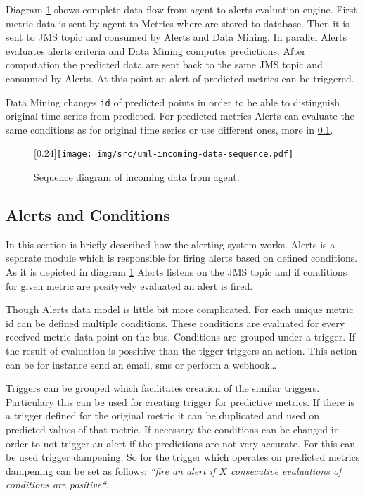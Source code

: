     Diagram \ref{img:sequence-incoming-data} shows complete data flow from agent to alerts evaluation engine.
    First metric data is sent by agent to Metrics where are stored to database. Then it is sent to JMS topic
    and consumed by Alerts and Data Mining. In parallel Alerts evaluates alerts criteria and Data Mining computes
    predictions. After computation the predicted data are sent back to the same JMS topic and consumed by Alerts.
    At this point an alert of predicted metrics can be triggered.

    Data Mining changes \texttt{id} of predicted points in order to be able to distinguish original time series from
    predicted. For predicted metrics Alerts can evaluate the same conditions as for original time series or use
    different ones, more in \ref{sec:alerts-conditions}.

    \begin{figure}[H]
        \begin{center}
            \scalebox{0.33}[0.24]{\texttt{[image: img/src/uml-incoming-data-sequence.pdf]}}
            \caption{Sequence diagram of incoming data from agent.}
            \label{img:sequence-incoming-data}
        \end{center}
    \end{figure}

        \subsection{Alerts and Conditions} \label{sec:alerts-conditions}
        In this section is briefly described how the alerting system works. Alerts is a separate module
        which is responsible for firing alerts based on defined conditions. As it is depicted in diagram
        \ref{img:sequence-incoming-data} Alerts listens on the JMS topic and if conditions for given metric are
        posityvely evaluated an alert is fired.

        Though Alerts data model is little bit more complicated. For each unique metric id can be defined multiple
        conditions. These conditions are evaluated for every received metric data point on the bus. Conditions are
        grouped under a trigger. If the result of evaluation is possitive than the tigger triggers an action. This
        action can be for instance send an email, sms or perform a webhook\dots

        Triggers can be grouped which facilitates creation of the similar triggers. Particulary this can be used for
        creating trigger for predictive metrics. If there is a trigger defined for the original metric it can be
        duplicated and used on predicted values of that metric. If necessary the conditions can be changed in
        order to not trigger an alert if the predictions are not very accurate. For this can be used trigger dampening.
        So for the trigger which operates on predicted metrics dampening can be set as follows: \emph{``fire an alert if
        $X$ consecutive evaluations of conditions are positive``}.

